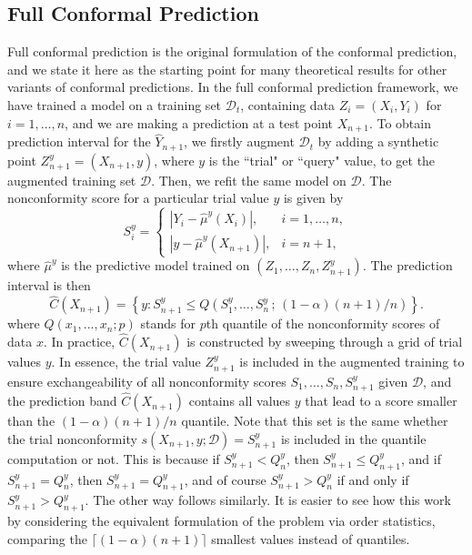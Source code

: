 \documentclass{article}
\theoremstyle{definition}
\begin{document}
\subsection{Full Conformal Prediction}
Full conformal prediction is the original formulation of the conformal prediction, and we state it here as the starting point for many theoretical results for other variants of conformal predictions. In the full conformal prediction framework, we have trained a model on a training set $\mathcal{D}_t$, containing data $Z_i = (X_i, Y_i)$ for $i=1, \dots, n$, and we are making a prediction at a test point $X_{n+1}$. To obtain prediction interval for the $\hat{Y}_{n+1}$, we firstly augment $\mathcal{D}_t$ by adding a synthetic point $Z_{n+1}^y = (X_{n+1}, y)$, where $y$ is the ``trial" or ``query" value, to get the augmented training set $\mathcal{D}$. Then, we refit the same model on $\mathcal{D}$. The nonconformity score for a particular trial value $y$ is given by
\begin{equation} \label{eq:full_conformal}
    S^y_i = 
    \begin{cases} 
    |Y_i - \hat{\mu}^y(X_i)|, & i = 1, \ldots, n, \\ %
    |y - \hat{\mu}^y(X_{n+1})|, & i = n+1,
    \end{cases}
\end{equation}
where $\hat{\mu}^y$ is the predictive model trained on $(Z_1, \dots, Z_n, Z_{n+1}^y)$. The prediction interval is then
\begin{equation} \label{eq:full_prediction_set}
    \hat{C}(X_{n+1}) = \left\{y : S^y_{n+1} \leq Q\left(S^y_1, \dots, S^y_{n}\,; \, (1-\alpha)(n+1)/n\right)\right\}.
\end{equation}
where $Q(x_1, ..., x_n; p)$ stands for $p$th quantile of the nonconformity scores of data $x$. In practice, $\hat{C}(X_{n+1})$ is constructed by sweeping through a grid of trial values $y$. In essence, the trial value $Z_{n+1}^y$ is included in the augmented training to ensure exchangeability of all nonconformity scores $S_1, \dots, S_n, S_{n+1}^y$ given $\mathcal{D}$, and the prediction band $\hat{C}(X_{n+1})$ contains all values $y$ that lead to a score smaller than the $(1-\alpha)(n+1)/n$ quantile. Note that this set is the same whether the trial nonconformity $s(X_{n+1}, y; \mathcal{D}) = S_{n+1}^y$ is included in the quantile computation or not. This is because if $S_{n+1}^y < Q_n^y$, then $S_{n+1}^y \le Q_{n+1}^y$, and if $S_{n+1}^y = Q_{n}^y$, then $S_{n+1}^y = Q_{n+1}^y$, and of course $S_{n+1}^y > Q_{n}^y$ if and only if $S_{n+1}^y > Q_{n+1}^y$. The other way follows similarly. It is easier to see how this work by considering the equivalent formulation of the problem via order statistics, comparing the $\lceil(1-\alpha)(n+1)\rceil$ smallest values instead of quantiles.
\end{document}
